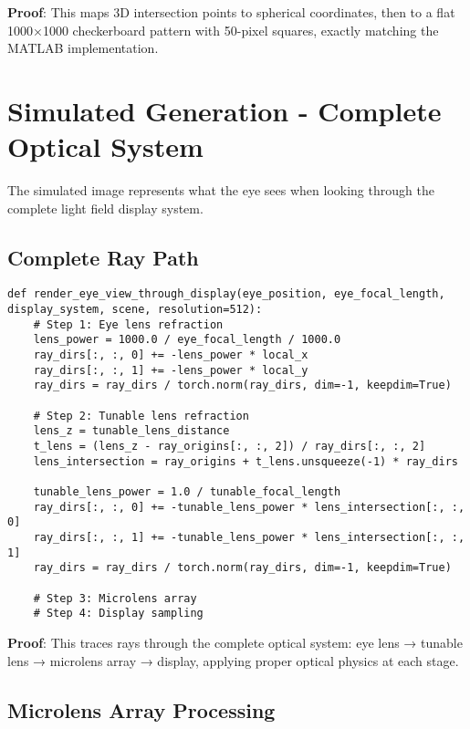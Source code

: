 \documentclass[11pt]{article}
\begin{document}
\textbf{Proof}: This maps 3D intersection points to spherical coordinates, then to a flat 1000×1000 checkerboard pattern with 50-pixel squares, exactly matching the MATLAB implementation.

\section{Simulated Generation - Complete Optical System}

The simulated image represents what the eye sees when looking through the complete light field display system.

\subsection{Complete Ray Path}

\begin{lstlisting}[caption={Complete optical system ray tracing}]
def render_eye_view_through_display(eye_position, eye_focal_length, display_system, scene, resolution=512):
    # Step 1: Eye lens refraction
    lens_power = 1000.0 / eye_focal_length / 1000.0
    ray_dirs[:, :, 0] += -lens_power * local_x
    ray_dirs[:, :, 1] += -lens_power * local_y
    ray_dirs = ray_dirs / torch.norm(ray_dirs, dim=-1, keepdim=True)
    
    # Step 2: Tunable lens refraction
    lens_z = tunable_lens_distance
    t_lens = (lens_z - ray_origins[:, :, 2]) / ray_dirs[:, :, 2]
    lens_intersection = ray_origins + t_lens.unsqueeze(-1) * ray_dirs
    
    tunable_lens_power = 1.0 / tunable_focal_length
    ray_dirs[:, :, 0] += -tunable_lens_power * lens_intersection[:, :, 0]
    ray_dirs[:, :, 1] += -tunable_lens_power * lens_intersection[:, :, 1]
    ray_dirs = ray_dirs / torch.norm(ray_dirs, dim=-1, keepdim=True)
    
    # Step 3: Microlens array
    # Step 4: Display sampling
\end{lstlisting}

\textbf{Proof}: This traces rays through the complete optical system: eye lens → tunable lens → microlens array → display, applying proper optical physics at each stage.

\subsection{Microlens Array Processing}
\end{document}
